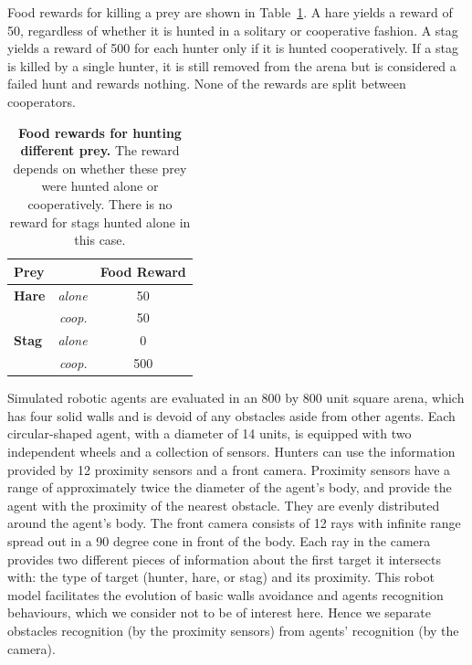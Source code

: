    Food rewards for killing a prey are shown in Table~\ref{table:tableRewardsInitial}. A hare yields a reward of 50, regardless of whether it is hunted in a solitary or cooperative fashion. A stag yields a reward of 500 for each hunter only if it is hunted cooperatively. If a stag is killed by a single hunter, it is still removed from the arena but is considered a failed hunt and rewards nothing. None of the rewards are split between cooperators.

    \begin{table}[ht]
      \centering
        \begin{tabular}{|l|r|c|}
          \hline
          \multicolumn{2}{|l|}{\textbf{Prey}} & \textbf{Food Reward} \\
          \hline
          \hline
          \textbf{Hare} & \textit{alone} & 50 \\
          \hline
          & \textit{coop.} & 50 \\
          \hline
          \textbf{Stag} & \textit{alone} & 0 \\
          \hline
          & \textit{coop.} & 500 \\
          \hline
        \end{tabular}
        \caption{\textbf{Food rewards for hunting different prey.}
        The reward depends on whether these prey were hunted alone or cooperatively. There is no reward for stags hunted alone in this case.}
      \label{table:tableRewardsInitial}
    \end{table}

    Simulated robotic agents are evaluated in an 800 by 800 unit square arena, which has four solid walls and is devoid of any obstacles aside from other agents. Each circular-shaped agent, with a diameter of 14 units, is equipped with two independent wheels and a collection of sensors. Hunters can use the information provided by 12 proximity sensors and a front camera. Proximity sensors have a range of approximately twice the diameter of the agent's body, and provide the agent with the proximity of the nearest obstacle. They are evenly distributed around the agent's body. The front camera consists of 12 rays with infinite range spread out in a 90 degree cone in front of the body. Each ray in the camera provides two different pieces of information about the first target it intersects with: the type of target (hunter, hare, or stag) and its proximity. This robot model facilitates the evolution of basic walls avoidance and agents recognition behaviours, which we consider not to be of interest here. Hence we separate obstacles recognition (by the proximity sensors) from agents' recognition (by the camera).

